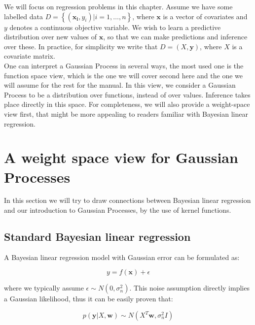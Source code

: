 \documentclass[10pt,a4paper,twoside]{book}
\begin{document}
We will focus on regression problems in this chapter. Assume we have some labelled data $D = \left\lbrace \left(\boldsymbol{x_i}, y_i\right) | i = 1,\dots,n\right\rbrace$, where $\boldsymbol{x}$ is a vector of covariates and $y$ denotes a continuous objective variable. We wish to learn a predictive distribution over new values of $\boldsymbol{x}$, so that we can make predictions and inference over these. In practice, for simplicity we write that $D = \left(X, \boldsymbol{y}\right)$, where $X$ is a covariate matrix.\\

One can interpret a Gaussian Process in several ways, the most used one is the function space view, which is the one we will cover second here and the one we will assume for the rest for the manual. In this view, we consider a Gaussian Process to be a distribution over functions, instead of over values. Inference takes place directly in this space. For completeness, we will also provide a weight-space view first, that might be more appealing to readers familiar with Bayesian linear regression.\\

\section{A weight space view for Gaussian Processes}

In this section we will try to draw connections between Bayesian linear regression and our introduction to Gaussian Processes, by the use of kernel functions. 

\subsection{Standard Bayesian linear regression}

A Bayesian linear regression model with Gaussian error can be formulated as:

\begin{equation}
\label{linearmodel}
y = f(\boldsymbol{x}) + \epsilon
\end{equation} 

where we typically assume $\epsilon \sim N(0, \sigma_n^2)$. This noise assumption directly implies a Gaussian likelihood, thus it can be easily proven that:

\begin{equation}
p(\boldsymbol{y}|X, \boldsymbol{w}) \sim N (X^T\boldsymbol{w}, \sigma_n^2 I)
\end{equation}
\end{document}
